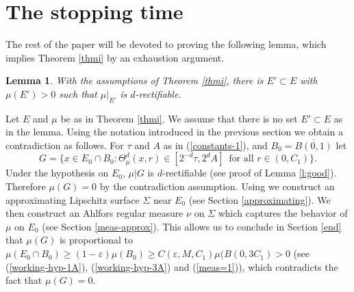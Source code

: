 \documentclass[11pt]{amsart}
\newcommand{\R}{{\mathbb R}}       %
\newcommand{\rf}[1]{{(\ref{#1})}}
\newcommand{\ve}{{\varepsilon}}
\newtheorem{lemma}[theorem]{Lemma}
\theoremstyle{definition}
\theoremstyle{remark}
\numberwithin{equation}{section}
\begin{document}


 

\section{The stopping time}\label{sec5}

The rest of the paper will be devoted to proving the following lemma, which implies Theorem \ref{thmi} by an exhaustion argument. 

\begin{lemma}
	\label{l:main}
	With the assumptions of Theorem \ref{thmi}, there is $E'\subset E$ with $\mu(E')>0$ such that $\mu|_{E'}$ is $d$-rectifiable.
\end{lemma}





 
Let $E$ and $\mu$ be as in Theorem \ref{thmi}. We assume that there is no set $E'\subset E$ as in the lemma. Using the notation introduced in the previous section we obtain a contradiction as follows.
For $\tau$ and $A$ as in \rf{constants-1}, and $B_0=\overline{B(0,1)}$ let
\begin{equation}\label{e:goodA}
	G=\{x\in {{E_{0}}}\cap B_0: \Theta^d_{\mu}(x,r)\in [2^{-d}\tau,2^dA] \,\mbox{ for all }r\in (0,C_{1})\}.
	\end{equation}
	Under the hypothesis on $E_0$, $\mu|G$ is $d$-rectifiable (see proof of Lemma \ref{l:good}). Therefore $\mu(G)=0$ by the contradiction assumption. Using \cite{DT12} we construct an approximating Lipschitz surface $\Sigma$ near $E_0$ (see Section
	\ref{approximating}). We then construct an Ahlfors regular measure $\nu$ on $\Sigma$ which captures the behavior of $\mu$ on $E_0$ (see Section \ref{meas-approx}). This allows us to conclude in Section
	\ref{end} that $\mu(G)$ is proportional to $\mu(E_0\cap B_0)\ge (1-\ve)\mu(B_0)\ge C(\ve, M, C_1)\mu(B(0,3C_1)>0$ (see \rf{working-hyp-1A}, \rf{working-hyp-3A} and \rf{meas=1}), which contradicts the fact that $\mu(G)=0$.
		
\end{document}
